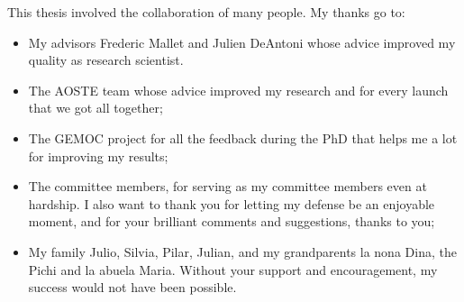 \cleardoublepage


\begin{acknowledgements}
This thesis involved the collaboration of many people. My thanks go to:
\begin{itemize}
	\item My advisors Frederic Mallet and Julien DeAntoni whose advice improved my quality as research scientist.
	\item The AOSTE team whose advice improved my research and for every launch that we got all together;
	\item The GEMOC project for all the feedback during the PhD that helps me a lot for improving my results; 
	\item The committee members, for serving as my committee members even at hardship. I also want to thank you for letting my defense be an enjoyable moment, and for your brilliant comments and suggestions, thanks to you;
	\item My family Julio, Silvia, Pilar, Julian, and my grandparents la nona Dina, the Pichi and la abuela Maria. Without your support and encouragement, my success would not have been possible.   
\end{itemize}








\end{acknowledgements}